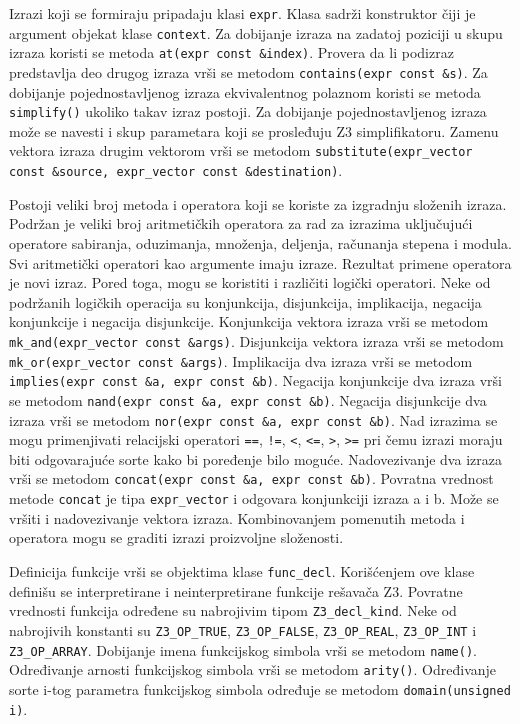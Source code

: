 \documentclass[12pt,oneside]{memoir}
\begin{document}
Izrazi koji se formiraju pripadaju klasi \texttt{expr}. Klasa sadrži konstruktor čiji je argument objekat klase \texttt{context}. Za dobijanje izraza na zadatoj poziciji u skupu izraza koristi se metoda \texttt{at(expr const \&index)}.  Provera da li podizraz predstavlja deo drugog izraza vrši se metodom  \texttt{contains(expr const \&s)}. Za dobijanje pojednostavljenog izraza ekvivalentnog polaznom koristi se metoda \texttt{simplify()} ukoliko takav izraz postoji. Za dobijanje pojednostavljenog izraza može se navesti i skup parametara koji se prosleđuju Z3 simplifikatoru. Zamenu vektora izraza drugim vektorom vrši se metodom \texttt{substitute(expr\_vector const \&source, expr\_vector const \&destination)}. 
\par
Postoji veliki broj metoda i operatora koji se koriste za izgradnju složenih izraza. Podržan je veliki broj aritmetičkih operatora za rad za izrazima uključujući operatore sabiranja, oduzimanja, množenja, deljenja, računanja stepena i modula. Svi aritmetički operatori kao argumente imaju izraze. Rezultat primene operatora je novi izraz. Pored toga, mogu se koristiti i različiti logički operatori. Neke od podržanih logičkih operacija su konjunkcija, disjunkcija, implikacija, negacija konjunkcije i negacija disjunkcije. Konjunkcija vektora izraza vrši se metodom \texttt{mk\_and(expr\_vector const \&args)}. Disjunkcija vektora izraza vrši se metodom \texttt{mk\_or(expr\_vector const \&args)}. Implikacija dva izraza vrši se metodom \texttt{implies(expr const \&a, expr const \&b)}. Negacija konjunkcije dva izraza vrši se metodom \texttt{nand(expr const  \&a, expr const \&b)}. Negacija disjunkcije dva izraza vrši se metodom \texttt{nor(expr const \&a, expr const \&b)}. Nad izrazima se mogu primenjivati relacijski operatori \texttt{==}, \texttt{!=}, \texttt{<}, \texttt{<=}, \texttt{>}, \texttt{>=} pri čemu izrazi moraju biti odgovarajuće sorte kako bi poređenje bilo moguće. Nadovezivanje dva izraza vrši se metodom \texttt{concat(expr const \&a, expr const \&b)}. 
Povratna vrednost metode \texttt{concat} je tipa \texttt{expr\_vector} i odgovara konjunkciji izraza a i b. Može se vršiti i nadovezivanje vektora izraza. Kombinovanjem pomenutih metoda i operatora mogu se graditi izrazi proizvoljne složenosti. 	
\par
Definicija funkcije vrši se objektima klase \texttt{func\_decl}. Korišćenjem ove klase definišu se interpretirane i neinterpretirane funkcije rešavača Z3. 
Povratne vrednosti funkcija određene su nabrojivim tipom \texttt{Z3\_decl\_kind}. Neke od nabrojivih konstanti su \texttt{Z3\_OP\_TRUE}, \texttt{Z3\_OP\_FALSE}, \texttt{Z3\_OP\_REAL}, \texttt{Z3\_OP\_INT} i \texttt{Z3\_OP\_ARRAY}. Dobijanje imena funkcijskog simbola vrši se metodom \texttt{name()}. Određivanje arnosti funkcijskog simbola vrši se metodom \texttt{arity()}. Određivanje sorte i-tog parametra funkcijskog simbola određuje se metodom \texttt{domain(unsigned i)}. 
\par
\end{document}
